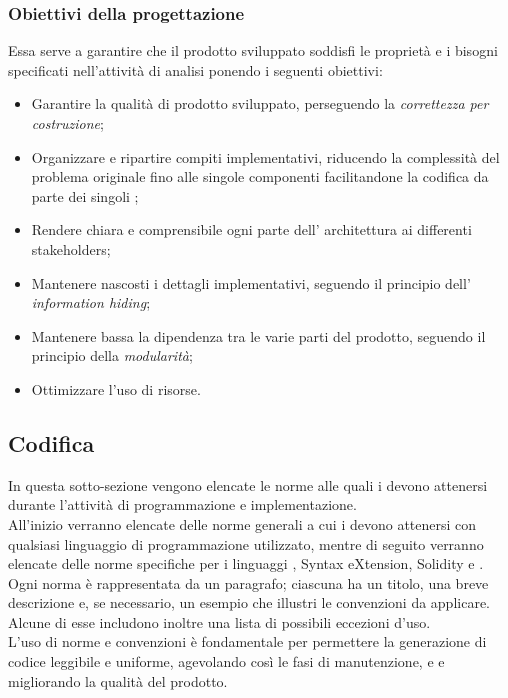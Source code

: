 \documentclass[NormeDiProgetto.tex]{subfiles}
\begin{document}
\subsubsection{Obiettivi della progettazione}
Essa serve a garantire che il prodotto sviluppato soddisfi le proprietà e i bisogni specificati nell'attività di analisi ponendo i seguenti obiettivi:
\begin{itemize}
	\item Garantire la qualità di prodotto sviluppato, perseguendo la \textit{correttezza
		per costruzione};
	\item Organizzare e ripartire compiti implementativi, riducendo la
	complessità del problema originale fino alle singole componenti
	facilitandone la codifica da parte dei singoli \progri;
	\item Rendere chiara e comprensibile ogni parte dell' architettura ai differenti stakeholders;
	\item Mantenere nascosti i dettagli implementativi, seguendo il principio dell' \textit{information hiding};
	\item Mantenere bassa la dipendenza tra le varie parti del prodotto, seguendo il principio della \textit{modularità};
	\item Ottimizzare l'uso di risorse.
\end{itemize}

\subsection{Codifica}
In questa sotto-sezione vengono elencate le norme alle quali i \progri devono attenersi durante l'attività di programmazione e implementazione.\\
All'inizio verranno elencate delle norme generali a cui i \progri devono attenersi con qualsiasi linguaggio di programmazione utilizzato, mentre di seguito verranno elencate delle norme specifiche per i linguaggi ,  Syntax eXtension, Solidity e .\\
Ogni norma è rappresentata da un paragrafo; ciascuna ha un titolo, una breve descrizione e, se necessario, un esempio che illustri le convenzioni da applicare. Alcune di esse includono inoltre una lista di possibili eccezioni d'uso.\\
L'uso di norme e convenzioni è fondamentale per permettere la generazione di codice leggibile e uniforme, agevolando così le fasi di manutenzione,  e  e migliorando la qualità del prodotto.
\end{document}
